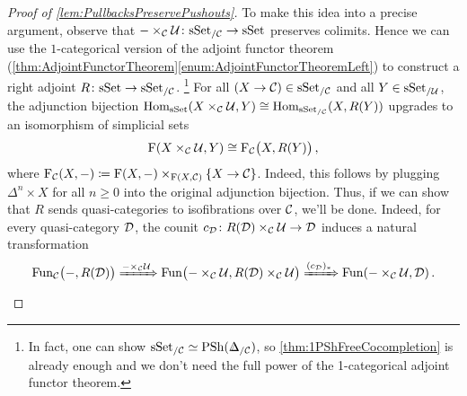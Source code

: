 \begin{proof}[Proof of \cref{lem:PullbacksPreservePushouts}]
	To make this idea into a precise argument, observe that $-\times_{\mathcal{C}}\mathcal{U}\colon\mathrm{sSet}_{/\mathcal{C}}\rightarrow \mathrm{sSet}$ preserves colimits. Hence we can use the $1$-categorical version of the adjoint functor theorem (\cref{thm:AdjointFunctorTheorem}\cref{enum:AdjointFunctorTheoremLeft}) to construct a right adjoint $R\colon \mathrm{sSet}\rightarrow \mathrm{sSet}_{/\mathcal{C}}$.%
	\footnote{In fact, one can show $\cat{sSet}_{/\Cc}\simeq \PSh(\IDelta_{/\Cc})$, so \cref{thm:1PShFreeCocompletion} is already enough and we don't need the full power of the 1-categorical adjoint functor theorem.
	}
	For all $(X\rightarrow \mathcal{C})\in\mathrm{sSet}_{/\mathcal{C}}$ and all $Y\in\mathrm{sSet}_{/\mathcal{U}}$, the adjunction bijection $\operatorname{Hom}_{\mathrm{sSet}}(X\times_{\mathcal{C}}\mathcal{U},Y)\cong \operatorname{Hom}_{\mathrm{sSet}_{/\mathcal{C}}}(X,R(Y))$ upgrades to an isomorphism of simplicial sets
	\begin{equation*}
		\operatorname{F}(X\times_{\mathcal{C}}\mathcal{U},Y)\cong \operatorname{F}_{\mathcal{C}}\bigl(X,R(Y)\bigr)\,,
	\end{equation*}
	where $\operatorname{F}_{\mathcal{C}}(X,-)\coloneqq \operatorname{F}(X,-)\times_{\operatorname{F}(X,\mathcal{C})}\{X\rightarrow \mathcal{C}\}$. Indeed, this follows by plugging $\Delta^n\times X$ for all $n\geqslant 0$ into the original adjunction bijection. Thus, if we can show that $R$ sends quasi-categories to isofibrations over $\mathcal{C}$, we'll be done. Indeed, for every quasi-category $\mathcal{D}$, the counit $c_{\mathcal{D}}\colon R(\mathcal{D})\times_{\mathcal{C}}\mathcal{U}\rightarrow \mathcal{D}$ induces a natural transformation
	\begin{equation*}
		\Fun_\Cc\bigl(-,R(\Dd)\bigr)\xRightarrow{-\times_\Cc\Uu}\Fun\bigl(-\times_\Cc\Uu,R(\Dd)\times_\Cc\Uu\bigr)\xRightarrow{(c_\Dd)_*} \Fun(-\times_\Cc\Uu,\Dd)\,.

\end{equation*}
\end{proof}
